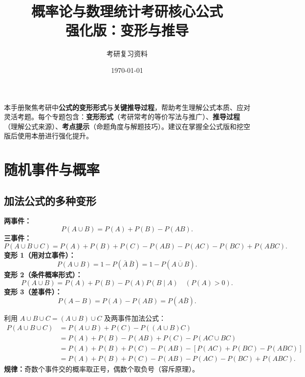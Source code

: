 \documentclass[11pt,a4paper]{article}
\title{\textbf{\color{mainblue}概率论与数理统计考研核心公式}\\\large 强化版：变形与推导}
\author{考研复习资料}
\date{\today}
\begin{document}
\maketitle
\thispagestyle{empty}

\begin{examtip}[使用说明]
本手册聚焦考研中\textbf{公式的变形形式}与\textbf{关键推导过程}，帮助考生理解公式本质、应对灵活考题。每个专题包含：\textbf{变形形式}（考研常考的等价写法与推广）、\textbf{推导过程}（理解公式来源）、\textbf{考点提示}（命题角度与解题技巧）。建议在掌握全公式版和挖空版后使用本册进行强化提升。
\end{examtip}

\tableofcontents
\newpage

\section{随机事件与概率}

\subsection{加法公式的多种变形}

\begin{variation}[加法公式的一般形式与变形]
\textbf{两事件：}
\[
P(A\cup B) = P(A)+P(B)-P(AB).
\]
\textbf{三事件：}
\[
P(A\cup B\cup C) = P(A)+P(B)+P(C)-P(AB)-P(AC)-P(BC)+P(ABC).
\]
\textbf{变形 1（用对立事件）：}
\[
P(A\cup B) = 1 - P(\bar A\,\bar B) = 1 - P(\overline{A\cup B}).
\]
\textbf{变形 2（条件概率形式）：}
\[
P(A\cup B) = P(A) + P(B) - P(A)P(B\mid A) \quad (P(A)>0).
\]
\textbf{变形 3（差事件）：}
\[
P(A-B) = P(A) - P(AB) = P(A\bar B).
\]
\end{variation}

\begin{derivation}[三事件加法公式推导]
利用 $A\cup B\cup C = (A\cup B)\cup C$ 及两事件加法公式：
\begin{align*}
P(A\cup B\cup C) &= P(A\cup B) + P(C) - P((A\cup B)C) \\
&= P(A)+P(B)-P(AB)+P(C)-P(AC\cup BC) \\
&= P(A)+P(B)+P(C)-P(AB)-[P(AC)+P(BC)-P(ABC)] \\
&= P(A)+P(B)+P(C)-P(AB)-P(AC)-P(BC)+P(ABC).
\end{align*}
\textbf{规律：}奇数个事件交的概率取正号，偶数个取负号（容斥原理）。
\end{derivation}
\end{document}
